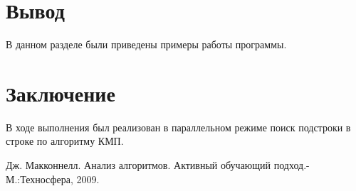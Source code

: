 \documentclass[a4paper, 14pt]{report}
\begin{document}
	\section{Вывод}
	
	В данном разделе были приведены примеры работы программы.

	\newpage
	\section*{Заключение}
	
	В ходе выполнения был реализован в параллельном режиме поиск подстроки в строке по алгоритму КМП.
	
\newpage
{}

\begin{thebibliography}{}
      Дж. Макконнелл. Анализ алгоритмов. Активный обучающий подход.-М.:Техносфера, 2009.
\end{thebibliography}
	
	\newpage
	
	
	
\end{document}
